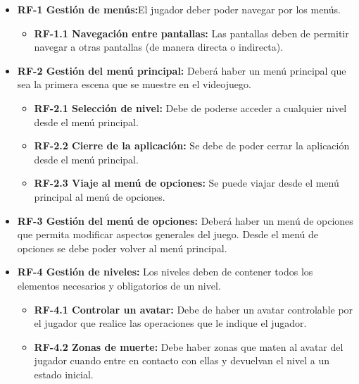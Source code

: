 \begin{itemize}
\item
\textbf{RF-1 Gestión de menús:}El jugador deber poder navegar por los menús.

\begin{itemize}
\item
\textbf{RF-1.1 Navegación entre pantallas:} Las pantallas deben de permitir navegar a otras pantallas (de manera directa o indirecta).
\end{itemize}

\item
\textbf{RF-2 Gestión del menú principal:} Deberá haber un menú principal que sea la primera escena que se muestre en el videojuego.

\begin{itemize}
\item
\textbf{RF-2.1 Selección de nivel:} Debe de poderse acceder a cualquier nivel desde el menú principal.
\end{itemize}

\begin{itemize}
\item
\textbf{RF-2.2 Cierre de la aplicación:} Se debe de poder cerrar la aplicación desde el menú principal.
\end{itemize}

\begin{itemize}
\item
\textbf{RF-2.3 Viaje al menú de opciones:} Se puede viajar desde el menú principal al menú de opciones.
\end{itemize}

\item
\textbf{RF-3 Gestión del menú de opciones:} Deberá haber un menú de opciones que permita modificar aspectos generales del juego. Desde el menú de opciones se debe poder volver al menú principal.

\item
\textbf{RF-4 Gestión de niveles:} Los niveles deben de contener todos los elementos necesarios y obligatorios de un nivel.

\begin{itemize}
\item
\textbf{RF-4.1 Controlar un avatar:} Debe de haber un avatar controlable por el jugador que realice las operaciones que le indique el jugador.
\end{itemize}

\begin{itemize}
\item
\textbf{RF-4.2 Zonas de muerte:} Debe haber zonas que maten al avatar del jugador cuando entre en contacto con ellas y devuelvan el nivel a un estado inicial.
\end{itemize}


\end{itemize}
